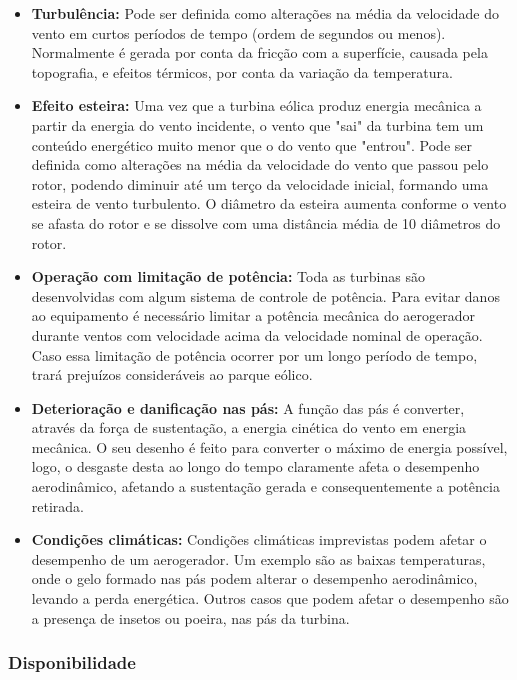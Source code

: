 \begin{itemize}
  \item \textbf{Turbulência:} Pode ser definida como alterações na média da velocidade do vento em curtos períodos de tempo (ordem de segundos ou menos). Normalmente é gerada por conta da fricção com a superfície, causada pela topografia, e efeitos térmicos, por conta da variação da temperatura.
  \item \textbf{Efeito esteira:} Uma vez que a turbina eólica produz energia mecânica a partir da energia do vento incidente, o vento que "sai" da turbina tem um conteúdo energético muito menor que o do vento que "entrou". Pode ser definida como alterações na média da velocidade do vento que passou pelo rotor, podendo diminuir até um terço da velocidade inicial, formando uma esteira de vento turbulento. O diâmetro da esteira aumenta conforme o vento se afasta do rotor e se dissolve com uma distância média de 10 diâmetros do rotor.
  \item \textbf{Operação com limitação de potência:} Toda as turbinas são desenvolvidas com algum sistema de controle de potência. Para evitar danos ao equipamento é necessário limitar a potência mecânica do aerogerador durante ventos com velocidade acima da velocidade nominal de operação. Caso essa limitação de potência ocorrer por um longo período de tempo, trará prejuízos consideráveis ao parque eólico.
  \item \textbf{Deterioração e danificação nas pás:} A função das pás é converter, através da força de sustentação, a energia cinética do vento em energia mecânica. O seu desenho é feito para converter o máximo de energia possível, logo, o desgaste desta ao longo do tempo claramente afeta o desempenho aerodinâmico, afetando a sustentação gerada e consequentemente a potência retirada.
  \item \textbf{Condições climáticas:} Condições climáticas imprevistas podem afetar o desempenho de um aerogerador. Um exemplo são as baixas temperaturas, onde o gelo formado nas pás podem alterar o desempenho aerodinâmico, levando a perda energética. Outros casos que podem afetar o desempenho são a presença de insetos ou poeira, nas pás da turbina.
\end{itemize}

\subsubsection{Disponibilidade}
\label{Sec:disponibilidadeDesempenhoAerogeradores}

